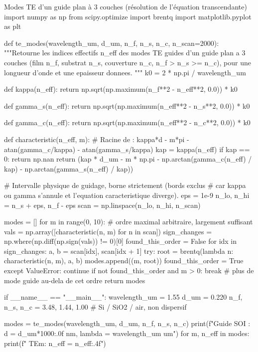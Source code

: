 \begin{coursecode}[language=Python]{Modes TE d'un guide plan à 3 couches (résolution de l'équation transcendante)}
import numpy as np
from scipy.optimize import brentq
import matplotlib.pyplot as plt

def te_modes(wavelength_um, d_um, n_f, n_s, n_c, n_scan=2000):
    """Retourne les indices effectifs n_eff des modes TE guides
    d'un guide plan a 3 couches (film n_f, substrat n_s, couverture n_c,
    n_f > n_s >= n_c), pour une longueur d'onde et une epaisseur donnees.
    """
    k0 = 2 * np.pi / wavelength_um

    def kappa(n_eff):
        return np.sqrt(np.maximum(n_f**2 - n_eff**2, 0.0)) * k0

    def gamma_s(n_eff):
        return np.sqrt(np.maximum(n_eff**2 - n_s**2, 0.0)) * k0

    def gamma_c(n_eff):
        return np.sqrt(np.maximum(n_eff**2 - n_c**2, 0.0)) * k0

    def characteristic(n_eff, m):
        # Racine de : kappa*d - m*pi - atan(gamma_c/kappa) - atan(gamma_s/kappa)
        kap = kappa(n_eff)
        if kap == 0:
            return np.nan
        return (kap * d_um
                - m * np.pi
                - np.arctan(gamma_c(n_eff) / kap)
                - np.arctan(gamma_s(n_eff) / kap))

    # Intervalle physique de guidage, borne strictement (bords exclus
    # car kappa ou gamma s'annule et l'equation caracteristique diverge).
    eps = 1e-9
    n_lo, n_hi = n_s + eps, n_f - eps
    scan = np.linspace(n_lo, n_hi, n_scan)

    modes = []
    for m in range(0, 10):  # ordre maximal arbitraire, largement suffisant
        vals = np.array([characteristic(n, m) for n in scan])
        sign_changes = np.where(np.diff(np.sign(vals)) != 0)[0]
        found_this_order = False
        for idx in sign_changes:
            a, b = scan[idx], scan[idx + 1]
            try:
                root = brentq(lambda n: characteristic(n, m), a, b)
                modes.append((m, root))
                found_this_order = True
            except ValueError:
                continue
        if not found_this_order and m > 0:
            break  # plus de mode guide au-dela de cet ordre
    return modes


if __name__ == "__main__":
    wavelength_um = 1.55
    d_um = 0.220
    n_f, n_s, n_c = 3.48, 1.44, 1.00  # Si / SiO2 / air, non dispersif

    modes = te_modes(wavelength_um, d_um, n_f, n_s, n_c)
    print(f"Guide SOI : d = {d_um*1000:.0f} nm, lambda = {wavelength_um} um")
    for m, n_eff in modes:
        print(f"  TE{m}: n_eff = {n_eff:.4f}")
\end{coursecode}

